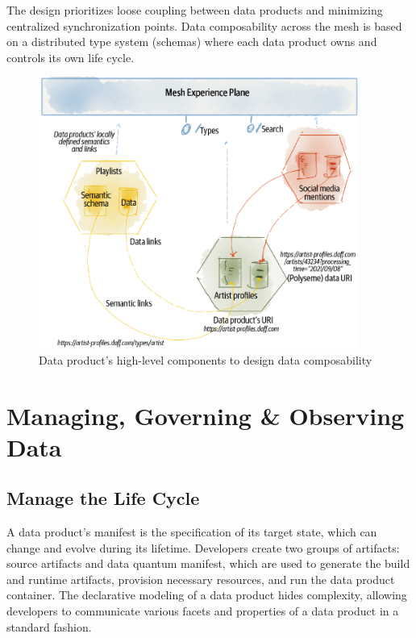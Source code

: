 \documentclass[12pt, a4paper]{book}
\begin{document}
The design prioritizes loose coupling between data products and minimizing centralized synchronization points. Data composability across the mesh is based on a distributed type system (schemas) where each data product owns and controls its own life cycle.

\begin{figure}[ht]
	\begin{framed}
		\centering
		\includegraphics[width=10.5cm]{ComposeData.png}
		\caption{Data product’s high-level components to design data composability}
		\label{ComposeData}
	\end{framed}
	\vspace{-.5cm}
\end{figure}

\section{Managing, Governing \& Observing Data}
\subsection{Manage the Life Cycle}
A data product's manifest is the specification of its target state, which can change and evolve during its lifetime. Developers create two groups of artifacts: source artifacts and data quantum manifest, which are used to generate the build and runtime artifacts, provision necessary resources, and run the data product container. The declarative modeling of a data product hides complexity, allowing developers to communicate various facets and properties of a data product in a standard fashion.
\end{document}
